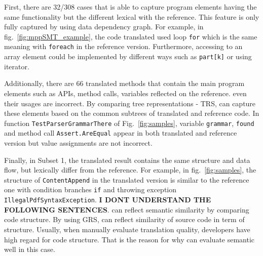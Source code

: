 First, there are 32/308 cases that {\model} is able to capture program 
elements having the same functionality but the different lexical with 
the reference. This feature is only fully captured by using data dependency 
graph. For example, in fig.~\ref{fig:mppSMT_example}, the code translated
used loop \texttt{for} which is the same meaning with \texttt{foreach} 
in the  reference version. Furthermore, accessing to an array element could 
be implemented by different ways such as \texttt{part[k]} or using iterator.
%

Additionally, there are 66 translated methods that contain the main program 
elements such as APIs, method calls, variables reflected on the reference. 
even their usages are incorrect. By comparing tree representations - TRS, 
{\model} can capture these elements based on the common subtrees of translated 
and reference code. In function \texttt{TestParserGrammarThere} of Fig.~\ref{fig:samples}, 
variable \texttt{grammar}, \texttt{found} and method call \texttt{Assert.AreEqual} 
appear in both translated and reference version but value assignments are not 
incorrect.
%

Finally, in Subset 1, the translated result contains the same structure and data flow, but 
lexically differ from the reference. For example, in fig.~\ref{fig:samples}, the structure 
of \texttt{ContentAppend} in the translated version is similar to the reference one with 
condition branches \texttt{if} and throwing exception \texttt{IllegalPdfSyntaxException}. 
\textbf{I DONT UNDERSTAND THE FOLLOWING SENTENCES}.
{\model} can reflect semantic similarity by comparing code structure. By using GRS, 
{\model} can reflect similarity of source code in term of structure. Usually, when 
manually evaluate translation quality, developers have high regard for code structure. 
That is the reason for why {\model} can evaluate semantic well in this case. 


